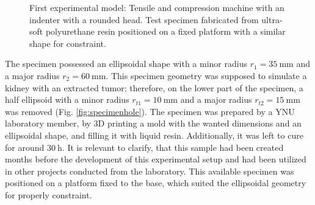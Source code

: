 \begin{figure}%
    \centering
   \qquad
   \caption[Experimental model I]{First experimental model: Tensile and compression machine with an indenter with a rounded head. Test specimen fabricated from ultra-soft polyurethane resin positioned on a fixed platform with a similar shape for constraint.}%
   \label{fig:firstexperiment}%
\end{figure}

The specimen possessed an ellipsoidal shape 
with a minor radius $r_1 = \SI{35}{\milli \m}$ and a major radius $r_2 = \SI{60}{\milli \m}$. 
This specimen geometry was supposed to simulate a kidney with an extracted tumor; therefore,
on the lower part of the specimen, a half ellipsoid with a minor radius $r_{t1} = \SI{10}{\milli \m}$ 
and a major radius $r_{t2} = \SI{15}{\milli \m}$ was removed (Fig. \ref{fig:specimenhole}). 
The specimen was prepared by a YNU laboratory member, by 3D printing a mold with the wanted dimensions
and an ellipsoidal shape, and filling it with liquid resin. 
Additionally, it was left to cure for around $\SI{30}{\hour}$. It is relevant to clarify, that this 
sample had been created months before the development of this experimental setup and 
had been utilized in other projects conducted from the laboratory.
This available specimen was positioned on a platform fixed to the base, which suited 
the ellipsoidal geometry for properly constraint. 

